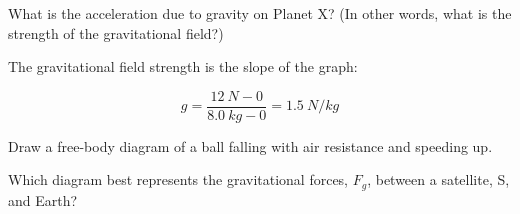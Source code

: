 \documentclass[answers]{exam}
\begin{document}
\begin{questions}
What is the acceleration due to gravity on Planet X? (In other words, what is the strength of the gravitational field?)

\begin{solution}
    The gravitational field strength is the slope of the graph:

\begin{equation*}
    g = \frac{\SI{12}{N} - 0}{\SI{8.0}{kg} - 0} = \boxed{\SI{1.5}{N/kg}}
\end{equation*}
\end{solution}


\question
Draw a free-body diagram of a ball falling with air resistance and speeding up.

\begin{center}
\end{center}


\ifprintanswers
\else
\clearpage
\fi

\begin{solution}
\begin{center}
\end{center}
\end{solution}

\question
Which diagram best represents the gravitational forces, $F_g$, between a satellite, S, and Earth?


\end{questions}
\end{document}
